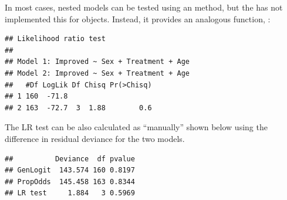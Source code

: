 \documentclass[11pt]{book}
\renewenvironment{knitrout}{\small\renewcommand{\baselinestretch}{.85}}{} %
\begin{document}
In most cases, nested models can be tested using an  method,
but the  has not implemented this for  objects.
Instead, it provides an analogous function, :
\begin{knitrout}
\color{fgcolor}\begin{kframe}
\begin{alltt}
\end{alltt}
\begin{verbatim}
## Likelihood ratio test
## 
## Model 1: Improved ~ Sex + Treatment + Age
## Model 2: Improved ~ Sex + Treatment + Age
##   #Df LogLik Df Chisq Pr(>Chisq)
## 1 160  -71.8                    
## 2 163  -72.7  3  1.88        0.6
\end{verbatim}
\end{kframe}
\end{knitrout}

The LR test can be also calculated as ``manually'' shown below using the difference
in residual deviance for the two models.
\begin{knitrout}
\color{fgcolor}\begin{kframe}
\begin{alltt}
 \hlkwb{<-} \hlstd{(}
   \hlstd{=} \hlstd{(} 
         \hlstd{=} \hlstd{(} 
        \hlstd{)}
 \hlkwb{<-}  
 \hlkwb{<-} \hlstd{(}\hlstd{,} \hlstd{,} \hlstd{)}
 \hlkwb{<-}  \hlstd{=}\hlopt{-}\hlstd{(tab[,}\hlstd{], tab[,}\hlstd{]))}
\end{alltt}
\begin{verbatim}
##          Deviance  df pvalue
## GenLogit  143.574 160 0.8197
## PropOdds  145.458 163 0.8344
## LR test     1.884   3 0.5969
\end{verbatim}
\end{kframe}
\end{knitrout}
\end{document}
